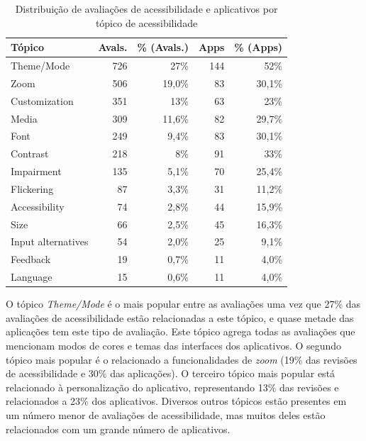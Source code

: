 \begin{table}[]
\centering
\caption{Distribuição de avaliações de acessibilidade e aplicativos por tópico de acessibilidade}
\label{tab:group-keywords}
\begin{tabular}{lrrrr}
\hline
Tópico         & Avals. & \% (Avals.) & Apps & \% (Apps) \\
\hline
Theme/Mode    & 726     & 27\%     & 144  & 52\%  \\
Zoom          & 506     & 19,0\%     & 83   & 30,1\%  \\
Customization & 351     & 13\%     & 63   & 23\%  \\
Media         & 309     & 11,6\%     & 82   & 29,7\%  \\
Font          & 249     & 9,4\%      & 83   & 30,1\%  \\
Contrast      & 218     & 8\%        & 91  & 33\%  \\
Impairment    & 135     & 5,1\%      & 70   & 25,4\%  \\
Flickering    & 87      & 3,3\%      & 31   & 11,2\%  \\
Accessibility & 74      & 2,8\%      & 44   & 15,9\%  \\
Size          & 66      & 2,5\%      & 45   & 16,3\%  \\
Input alternatives        & 54      & 2,0\%      & 25   & 9,1\%   \\
Feedback      & 19      & 0,7\%      & 11   & 4,0\%   \\
Language      & 15      & 0,6\%      & 11   & 4,0\%  \\
\hline
\end{tabular}
\end{table}

O tópico \textit{Theme/Mode} é o mais popular entre as avaliações uma vez que 27\% das avaliações de acessibilidade estão relacionadas a este tópico, e quase metade das aplicações tem este tipo de avaliação. 
Este tópico agrega todas as avaliações que mencionam modos de cores e temas das interfaces dos aplicativos. 
O segundo tópico mais popular é o relacionado a funcionalidades de \textit{zoom} (19\% das revisões de acessibilidade e 30\% das aplicações).
O terceiro tópico mais popular está relacionado à personalização do aplicativo, representando 13\% das revisões e relacionados a 23\% dos aplicativos. 
Diversos outros tópicos estão presentes em um número menor de avaliações de acessibilidade, mas muitos deles estão relacionados com um grande número de aplicativos. 

